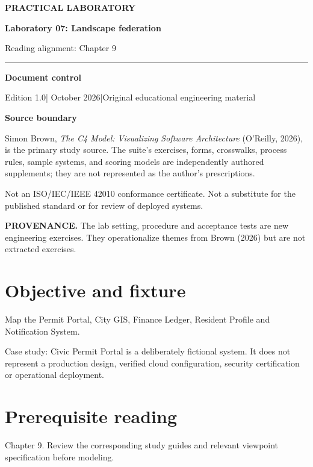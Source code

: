 \documentclass[10pt,letterpaper]{article}
\newcommand{\SourceNote}[1]{\par\smallskip\noindent\colorbox{C4Light}{\parbox{0.94\linewidth}{\footnotesize\textbf{PROVENANCE.} #1}}\par\medskip}
\newcommand{\DocStart}[3]{%
\begin{document}
\begin{titlepage}
\renewcommand{\thepage}{title-\arabic{page}}
\vspace*{0.55in}
{\sffamily\bfseries\small\color{C4Teal}#1}\par\vspace{0.24in}
{\sffamily\bfseries\fontsize{26}{31}\selectfont\color{C4Navy}#2}\par\vspace{0.18in}
{\large\color{C4Gray}#3}\par\vspace{0.4in}
\textcolor{C4Teal}{\rule{\linewidth}{1.15pt}}\par\vspace{0.24in}
\textbf{Document control}\par
Edition 1.0\quad|\quad 30 October 2026\quad|\quad Original educational engineering material\par
\vspace{0.17in}
\textbf{Source boundary}\par
Simon Brown, \emph{The C4 Model: Visualizing Software Architecture} (O'Reilly, 2026), is the primary study source. The suite's exercises, forms, crosswalks, process rules, sample systems, and scoring models are independently authored supplements; they are not represented as the author's prescriptions.\par
\vfill
{\small\color{C4Gray}Not an ISO/IEC/IEEE 42010 conformance certificate. Not a substitute for the published standard or for review of deployed systems.}\par
\end{titlepage}
}
\DocStart{PRACTICAL LABORATORY}{Laboratory 07: Landscape federation}{Reading alignment: Chapter 9}
\SourceNote{The lab setting, procedure and acceptance tests are new engineering exercises. They operationalize themes from Brown (2026) but are not extracted exercises.}
\section{Objective and fixture}
Map the Permit Portal, City GIS, Finance Ledger, Resident Profile and Notification System.

Case study: Civic Permit Portal is a deliberately fictional system. It does not represent a production design, verified cloud configuration, security certification or operational deployment.


\section{Prerequisite reading}
Chapter 9. Review the corresponding study guides and relevant viewpoint specification before modeling.
\end{document}
